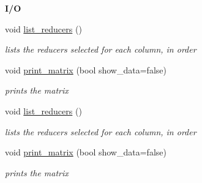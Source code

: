 \begin{Indent}\textbf{ I/O}\par
\begin{DoxyCompactItemize}
\item 
\mbox{\label{group___g_b_computation_af4491ffa78cb0e75051492b83f51744b}} 
void \hyperlink{group___g_b_computation_af4491ffa78cb0e75051492b83f51744b}{list\+\_\+reducers} ()
\begin{DoxyCompactList}\small\item\em lists the reducers selected for each column, in order \end{DoxyCompactList}\item 
void \hyperlink{group___g_b_computation_a9f3e9b5617084c34f97acd23d6e67a43}{print\+\_\+matrix} (bool show\+\_\+data=false)
\begin{DoxyCompactList}\small\item\em prints the matrix \end{DoxyCompactList}\item 
\mbox{\label{group___g_b_computation_af4491ffa78cb0e75051492b83f51744b}} 
void \hyperlink{group___g_b_computation_af4491ffa78cb0e75051492b83f51744b}{list\+\_\+reducers} ()
\begin{DoxyCompactList}\small\item\em lists the reducers selected for each column, in order \end{DoxyCompactList}\item 
void \hyperlink{group___g_b_computation_a9f3e9b5617084c34f97acd23d6e67a43}{print\+\_\+matrix} (bool show\+\_\+data=false)
\begin{DoxyCompactList}\small\item\em prints the matrix \end{DoxyCompactList}\end{DoxyCompactItemize}
\end{Indent}
